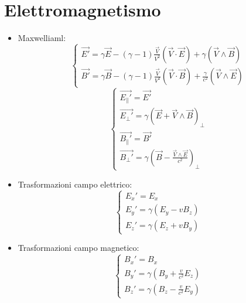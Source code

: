 \documentclass[a4paper]{article}
\begin{document}
    \section{Elettromagnetismo}
        \begin{itemize}
            \item Maxwelliaml:\\
                $$\begin{cases}
                    \vec{E'}=\gamma\vec{E}-(\gamma-1)\frac{\vec{V}}{V^2}(\vec{V}\cdot\vec{E})+\gamma(\vec{V}\wedge\vec{B})\\
                    \vec{B'}=\gamma\vec{B}-(\gamma-1)\frac{\vec{V}}{V^2}(\vec{V}\cdot\vec{B})+\frac{\gamma}{c^2}(\vec{V}\wedge\vec{E})
                \end{cases}$$
                $$\begin{cases}
                    \vec{E_\|'}=\vec{E'}\\
                    \vec{E_\perp'}=\gamma(\vec{E}+\vec{V}\wedge\vec{B})_\perp\\
                    \vec{B_\|'}=\vec{B'}\\
                    \vec{B_\perp'}=\gamma(\vec{B}-\frac{\vec{V}\wedge\vec{E}}{c^2})_\perp
                \end{cases}$$
            \item Trasformazioni campo elettrico:
                $$\begin{cases}
                    E_x'=E_x\\
                    E_y'=\gamma(E_y-vB_z)\\
                    E_z'=\gamma(E_z+vB_y)
                \end{cases}$$
            \item Trasformazioni campo magnetico:
                $$\begin{cases}
                    B_x'=B_x\\
                    B_y'=\gamma\left(B_y+\frac{v}{c^2}E_z\right)\\
                    B_z'=\gamma\left(B_z-\frac{v}{c^2}E_y\right)
                \end{cases}$$
        \end{itemize}
\end{document}
